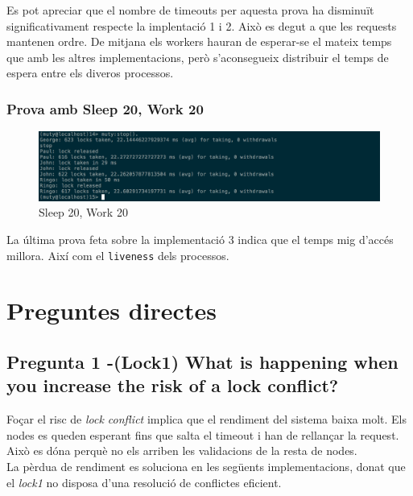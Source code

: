 \documentclass[a4paper, 11pt]{article}
\begin{document}
Es pot apreciar que el nombre de timeouts per aquesta prova ha disminuït significativament respecte la implentació 1 i 2. Això es degut a que les requests mantenen ordre. De mitjana els workers hauran de esperar-se el mateix temps que amb les altres implementacions, però s'aconsegueix distribuir el temps de espera entre els diveros processos. 

\subsubsection{Prova amb Sleep 20, Work 20}

\begin{figure}[H]
    \centering
    \includegraphics[width=1.0\textwidth]{figures/20-20lock3}
    \caption{Sleep 20, Work 20 \label{fig:20-20lock3}}    
\end{figure}

La última prova feta sobre la implementació 3 indica que el temps mig d'accés millora. Així com el \texttt{liveness} dels processos.

\section{Preguntes directes}


\subsection{Pregunta 1 -(Lock1) What is happening when you increase the risk of a lock conflict?}
Foçar el risc de \textit{lock conflict} implica que el rendiment del sistema baixa molt. Els nodes es queden esperant fins que salta el timeout i han de rellançar la request. Això es dóna perquè no els arriben les validacions de la resta de nodes. \\
La pèrdua de rendiment es soluciona en les següents implementacions, donat que el \textit{lock1} no disposa d'una resolució de conflictes eficient. 
\end{document}
